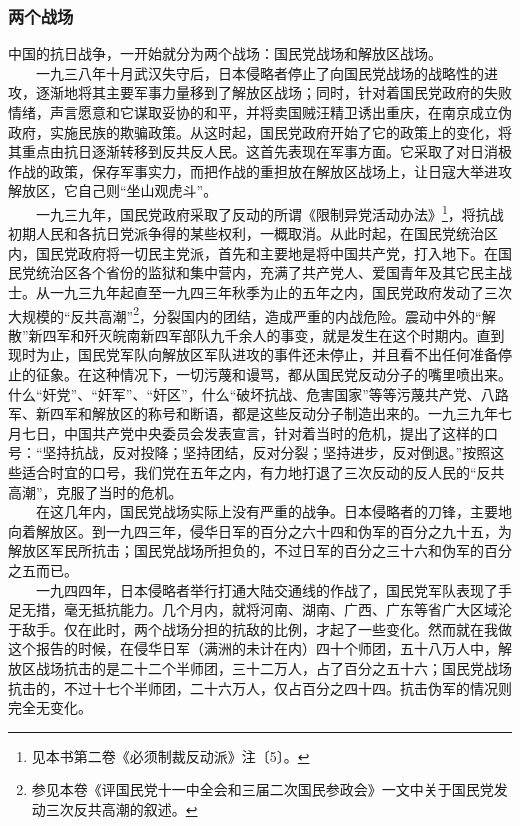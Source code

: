 \documentclass[cn,11pt,chinese]{elegantbook}
\def\myformat#1{\hfil\hfil #1}
\begin{document}
\subsubsection*{\myformat{两个战场}}
中国的抗日战争，一开始就分为两个战场：国民党战场和解放区战场。\\
　　一九三八年十月武汉失守后，日本侵略者停止了向国民党战场的战略性的进攻，逐渐地将其主要军事力量移到了解放区战场；同时，针对着国民党政府的失败情绪，声言愿意和它谋取妥协的和平，并将卖国贼汪精卫诱出重庆，在南京成立伪政府，实施民族的欺骗政策。从这时起，国民党政府开始了它的政策上的变化，将其重点由抗日逐渐转移到反共反人民。这首先表现在军事方面。它采取了对日消极作战的政策，保存军事实力，而把作战的重担放在解放区战场上，让日寇大举进攻解放区，它自己则“坐山观虎斗”。\\
　　一九三九年，国民党政府采取了反动的所谓《限制异党活动办法》\footnote[7]{ 见本书第二卷《必须制裁反动派》注〔5〕。}，将抗战初期人民和各抗日党派争得的某些权利，一概取消。从此时起，在国民党统治区内，国民党政府将一切民主党派，首先和主要地是将中国共产党，打入地下。在国民党统治区各个省份的监狱和集中营内，充满了共产党人、爱国青年及其它民主战士。从一九三九年起直至一九四三年秋季为止的五年之内，国民党政府发动了三次大规模的“反共高潮”\footnote[8]{ 参见本卷《评国民党十一中全会和三届二次国民参政会》一文中关于国民党发动三次反共高潮的叙述。}，分裂国内的团结，造成严重的内战危险。震动中外的“解散”新四军和歼灭皖南新四军部队九千余人的事变，就是发生在这个时期内。直到现时为止，国民党军队向解放区军队进攻的事件还未停止，并且看不出任何准备停止的征象。在这种情况下，一切污蔑和谩骂，都从国民党反动分子的嘴里喷出来。什么“奸党”、“奸军”、“奸区”，什么“破坏抗战、危害国家”等等污蔑共产党、八路军、新四军和解放区的称号和断语，都是这些反动分子制造出来的。一九三九年七月七日，中国共产党中央委员会发表宣言，针对着当时的危机，提出了这样的口号：“坚持抗战，反对投降；坚持团结，反对分裂；坚持进步，反对倒退。”按照这些适合时宜的口号，我们党在五年之内，有力地打退了三次反动的反人民的“反共高潮”，克服了当时的危机。\\
　　在这几年内，国民党战场实际上没有严重的战争。日本侵略者的刀锋，主要地向着解放区。到一九四三年，侵华日军的百分之六十四和伪军的百分之九十五，为解放区军民所抗击；国民党战场所担负的，不过日军的百分之三十六和伪军的百分之五而已。\\
　　一九四四年，日本侵略者举行打通大陆交通线的作战了，国民党军队表现了手足无措，毫无抵抗能力。几个月内，就将河南、湖南、广西、广东等省广大区域沦于敌手。仅在此时，两个战场分担的抗敌的比例，才起了一些变化。然而就在我做这个报告的时候，在侵华日军（满洲的未计在内）四十个师团，五十八万人中，解放区战场抗击的是二十二个半师团，三十二万人，占了百分之五十六；国民党战场抗击的，不过十七个半师团，二十六万人，仅占百分之四十四。抗击伪军的情况则完全无变化。\\
\end{document}

